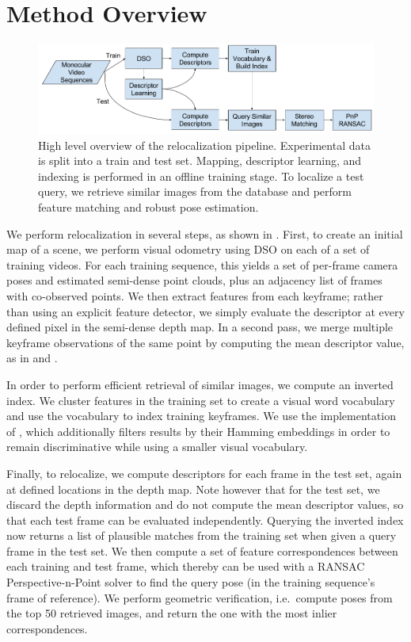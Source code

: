 \chapter{Method Overview}


\begin{figure}[b]
	\centering
	\includegraphics[width=\linewidth]{methodology/retrieval_pipeline.png}
	\caption{High level overview of the relocalization pipeline. Experimental data is split into a train and test set. Mapping, descriptor learning, and indexing is performed in an offline training stage. To localize a test query, we retrieve similar images from the database and perform feature matching and robust pose estimation.}
	\label{fig:pipeline}
\end{figure}

We perform relocalization in several steps, as shown in . First, to create an initial map of a scene, we perform visual odometry using DSO on each of a set of training videos. For each training sequence, this yields a set of per-frame camera poses and estimated semi-dense point clouds, plus an adjacency list of frames with co-observed points. We then extract features from each keyframe; rather than using an explicit feature detector, we simply evaluate the descriptor at every defined pixel in the semi-dense depth map. In a second pass, we merge multiple keyframe observations of the same point by computing the mean descriptor value, as in \cite{sattler2011fast} and \cite{schmidt2017self}.

In order to perform efficient retrieval of similar images, we compute an inverted index. We cluster features in the training set to create a visual word vocabulary and use the vocabulary to index training keyframes. We use the implementation of \cite{Sattler16CVPR}, which additionally filters results by their Hamming embeddings in order to remain discriminative while using a smaller visual vocabulary.

Finally, to relocalize, we compute descriptors for each frame in the test set, again at defined locations in the depth map. Note however that for the test set, we discard the depth information and do not compute the mean descriptor values, so that each test frame can be evaluated independently. Querying the inverted index now returns a list of plausible matches from the training set when given a query frame in the test set. We then compute a set of feature correspondences between each training and test frame, which thereby can be used with a RANSAC Perspective-n-Point solver to find the query pose (in the training sequence's frame of reference). We perform geometric verification, i.e.\ compute poses from the top 50 retrieved images, and return the one with the most inlier correspondences.

